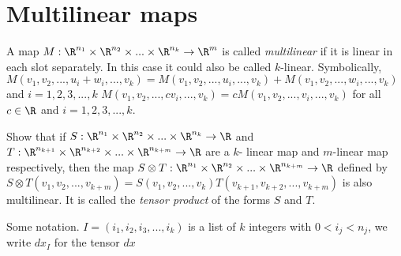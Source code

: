 
	\section{Multilinear maps}
	
	\begin{definition}
		A map $M: \R^{n_1} \times \R^{n_2} \times ... \times \R^{n_k} \to \R^m$ is called \textit{multilinear} if it is linear in each slot separately.  In this case
		it could also be called $k$-linear.
		  Symbolically,
		$M(v_1,v_2,...,u_i+w_i,...,v_k) = M(v_1,v_2,...,u_i,...,v_k)+ M(v_1,v_2,...,w_i,...,v_k)$ and $i  = 1,2,3,...,k$
		$M(v_1,v_2,...,cv_i,...,v_k) = cM(v_1,v_2,...,v_i,...,v_k)$ for all $c\in \R$ and $i  = 1,2,3,...,k$.
	\end{definition}
	
	\begin{question}
		Show that if $S: \R^{n_1} \times \R^{n_2} \times ... \times \R^{n_k} \to \R$ and  $T: \R^{n_{k+1}} \times \R^{n_{k+2}} \times ... \times \R^{n_{k+m}} \to \R$
		are a $k$- linear map and $m$-linear map respectively, then the map $S \otimes T: \R^{n_1} \times \R^{n_2} \times ... \times \R^{n_{k+m}} \to \R$ defined by
		$S \otimes T(v_1,v_2,...,v_{k+m}) = S(v_1,v_2,...,v_k)T(v_{k+1},v_{k+2},...,v_{k+m})$ is also multilinear.  
		It is called the \textit{tensor product} of the forms $S$ and $T$.
	\end{question}
	
	Some notation.  $I = (i_1,i_2,i_3,...,i_k)$ is a list of $k$ integers with $  0< i_j < n_j $, we write $dx_I$ for the tensor $dx_{}$
	
	
